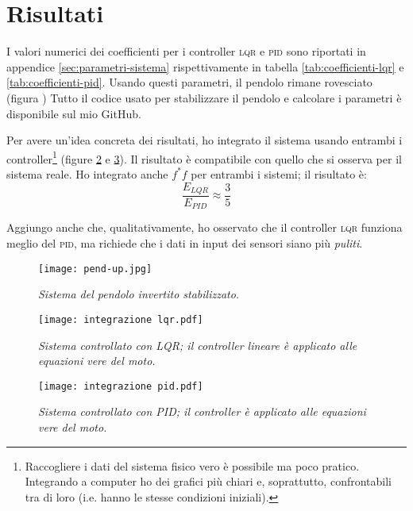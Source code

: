 \section{Risultati}\label{sec:risultati}
I valori numerici dei coefficienti per i controller \textsc{lqr} e \textsc{pid} sono riportati in appendice \ref{sec:parametri-sistema}
rispettivamente in tabella \ref{tab:coefficienti-lqr} e \ref{tab:coefficienti-pid}.
Usando questi parametri, il pendolo rimane rovesciato (figura )%
Tutto il codice usato per stabilizzare il pendolo e calcolare i parametri è disponibile sul mio GitHub\cite{github}.

Per avere un'idea concreta dei risultati, ho integrato il sistema usando entrambi i controller\footnote{Raccogliere
i dati del sistema fisico vero è possibile ma poco pratico. Integrando a computer ho dei grafici più chiari e, soprattutto,
confrontabili tra di loro (i.e. hanno le stesse condizioni iniziali).} (figure \ref{fig:int-lqr} e \ref{fig:int-pid}).
Il risultato è compatibile con quello che si osserva per il sistema reale.
Ho integrato anche $f^*f$ per entrambi i sistemi; il risultato è:
\begin{equation}
  \frac {E_{LQR} } {E_{PID}} \approx \frac 3 5
  \label{eq:rapporto-f}
\end{equation}

Aggiungo anche che, qualitativamente, ho osservato che il controller \textsc{lqr} funziona meglio del \textsc{pid}, ma
richiede che i dati in input dei sensori siano più \emph{puliti}.

\begin{figure}[h]
  \texttt{[image: pend-up.jpg]}
  \caption{\emph{Sistema del pendolo invertito stabilizzato.}}
  \label{fig:pend-up}
\end{figure}

\begin{figure}[h]
  \texttt{[image: integrazione lqr.pdf]}
  \caption{\emph{Sistema controllato con LQR; il controller lineare è applicato alle equazioni vere del moto.}}
  \label{fig:int-lqr}
\end{figure}

\begin{figure}[h]
  \texttt{[image: integrazione pid.pdf]}
  \caption{\emph{Sistema controllato con PID; il controller è applicato alle equazioni vere del moto.}}
  \label{fig:int-pid}
\end{figure}




